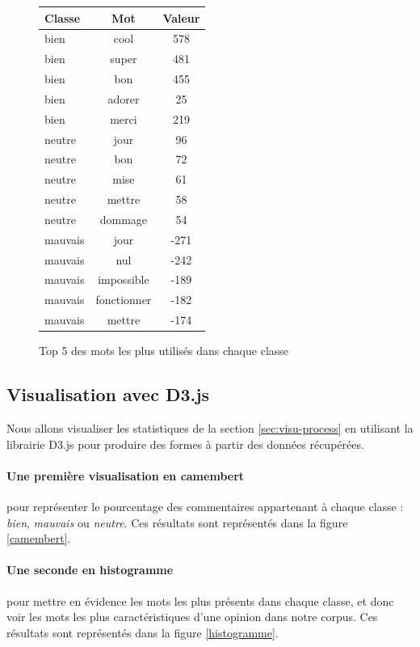 \documentclass[a4paper, 11pt]{article}
\begin{document}
\begin{figure}[h]
\begin{center}


\begin{tabular}{|l|c|c|}
\hline
Classe &	Mot&	Valeur\\
\hline
\hline
bien&	cool&	578\\
\hline
bien&	super&	481\\
\hline
bien&	bon	&455\\
\hline
bien&	adorer&	25\\
\hline
bien&	merci&	219\\
\hline
\hline
neutre&	jour&	96\\
\hline
neutre&	bon	&72\\
\hline
neutre&	mise&	61\\
\hline
neutre&	mettre&	58\\
\hline
neutre&	dommage	&54\\
\hline
\hline
mauvais&	jour&	-271\\
\hline
mauvais	&nul	&-242\\
\hline
mauvais	&impossible	&-189\\
\hline
mauvais	&fonctionner&	-182\\
\hline
mauvais	&mettre&	-174\\
\hline
\end{tabular}
\end{center}
\caption{Top 5 des mots les plus utilisés dans chaque classe}
\label{mots les plus utilisés}
\end{figure}
 
\subsection{Visualisation avec D3.js}
 
Nous allons visualiser les statistiques de la section \ref{sec:visu-process} en utilisant la librairie D3.js pour produire des formes à partir des données récupérées.
 
\paragraph{Une première visualisation en camembert}pour représenter le pourcentage des commentaires appartenant à chaque classe : \textit{bien}, \textit{mauvais} ou \textit{neutre}. Ces résultats sont représentés dans la figure \ref{camembert}.\\
\paragraph{Une seconde en histogramme}pour mettre en évidence les mots les plus présents dans chaque classe, et donc voir les mots les plus caractéristiques d'une opinion dans notre corpus. Ces résultats sont représentés dans la figure \ref{histogramme}.
\end{document}
